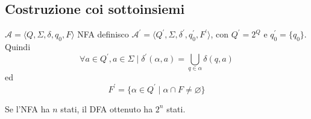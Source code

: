 \documentclass[12pt]{article}
\begin{document}
\subsection{Costruzione coi sottoinsiemi}
\begin{center}
\end{center}
$\mathcal{A} = \langle Q, \Sigma, \delta, q_0, F \rangle$ NFA definisco $\mathcal{A}^\prime = \langle Q^\prime, \Sigma, \delta^\prime, q_0^\prime, F^\prime \rangle$, con $Q^\prime = 2^Q$ e $q_0^\prime = \{ q_0 \}$.
% 
Quindi
$$\forall a \in Q^\prime, a \in \Sigma \mid \delta^\prime(\alpha, a) = \bigcup_{q \in \alpha} \delta(q, a) $$
ed
$$ F^\prime = \{ \alpha \in Q^\prime \mid \alpha \cap F \neq \varnothing\} $$

Se l'NFA ha $n$ stati, il DFA ottenuto ha $2^n$ stati.
\end{document}
